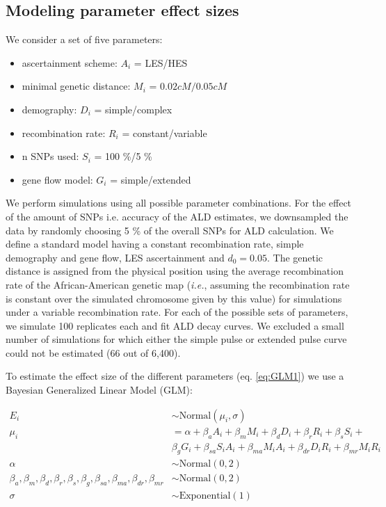 \documentclass[11pt]{article}
\begin{document}
\subsection{Modeling parameter effect sizes}\label{modeling prameter effect sizes}

We consider a set of five parameters:
\begin{itemize} 
    \item ascertainment scheme: $A_i$ = LES/HES
    \item minimal genetic distance: $M_i$ = $0.02 cM/ 0.05 cM$
    \item demography: $D_i$ = simple/complex
    \item recombination rate: $R_i$ = constant/variable
    \item n SNPs used: $S_i$ = 100 \%/5 \%
    \item gene flow model: $G_i$ = simple/extended
\end{itemize}

We perform simulations using all possible parameter combinations. For the effect of the amount of SNPs i.e. accuracy of the ALD estimates, we downsampled the data by randomly choosing 5 \% of the overall SNPs for ALD calculation.
We define a standard model having a constant recombination rate, simple demography and gene flow, LES ascertainment and $d_0 = 0.05$.
The genetic distance is assigned from the physical  position using the average recombination rate of the African-American genetic map (\emph{i.e.}, assuming the recombination rate is constant over the simulated chromosome given by this value) for simulations under a variable recombination rate.
For each of the possible sets of parameters, we simulate 100 replicates each and fit ALD decay curves. We excluded a small number of simulations for which either the simple pulse or extended pulse  curve could not be estimated (66 out of 6,400). 



To estimate the effect size of the different parameters (eq.
\ref{eq:GLM1}) we use a Bayesian Generalized Linear Model (GLM):

\begin{equation}\label{eq:GLM1}
\begin{split}
E_i &\sim \text{Normal}(\mu_i,\sigma) \\
\mu_i &= \alpha + \beta_aA_i + \beta_mM_i + \beta_dD_i + \beta_rR_i + \beta_{s}S_i + \\ &\beta_gG_i + \beta_{sa}S_iA_i + \beta_{ma}M_iA_i + \beta_{dr}D_iR_i + \beta_{mr}M_iR_i \\
\alpha &\sim \text{Normal}(0,2) \\
\beta_a,\beta_m,\beta_d,\beta_r,\beta_{s},\beta_g,\beta_{sa}, \beta_{ma},\beta_{dr}, \beta_{mr} &\sim \text{Normal}(0,2) \\
\sigma &\sim \text{Exponential}(1)
\end{split}
\end{equation}
\end{document}
